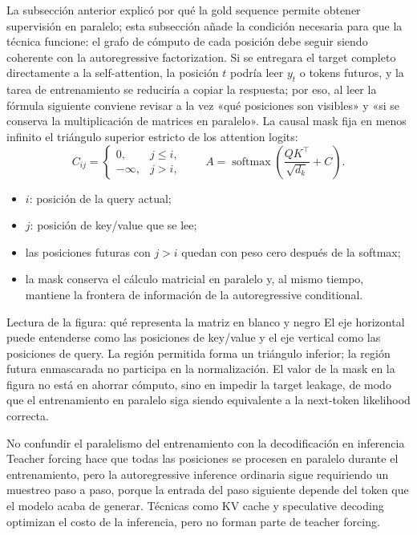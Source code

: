 La subsección anterior explicó por qué la gold sequence permite obtener supervisión en paralelo; esta subsección añade la condición necesaria para que la técnica funcione: el grafo de cómputo de cada posición debe seguir siendo coherente con la autoregressive factorization. Si se entregara el target completo directamente a la self-attention, la posición $t$ podría leer $y_t$ o tokens futuros, y la tarea de entrenamiento se reduciría a copiar la respuesta; por eso, al leer la fórmula siguiente conviene revisar a la vez «qué posiciones son visibles» y «si se conserva la multiplicación de matrices en paralelo». La causal mask fija en menos infinito el triángulo superior estricto de los attention logits:
\[
C_{ij}=\begin{cases}
0, & j\le i,\\
-\infty, & j>i,
\end{cases}
\qquad
A=\operatorname{softmax}\!\left(\frac{QK^{\top}}{\sqrt{d_k}}+C\right).
\]

\begin{itemize}
  \item $i$: posición de la query actual;
  \item $j$: posición de key/value que se lee;
  \item las posiciones futuras con $j>i$ quedan con peso cero después de la softmax;
  \item la mask conserva el cálculo matricial en paralelo y, al mismo tiempo, mantiene la frontera de información de la autoregressive conditional.
\end{itemize}


\begin{knowledgebox}{Lectura de la figura: qué representa la matriz en blanco y negro}
El eje horizontal puede entenderse como las posiciones de key/value y el eje vertical como las posiciones de query. La región permitida forma un triángulo inferior; la región futura enmascarada no participa en la normalización. El valor de la mask en la figura no está en ahorrar cómputo, sino en impedir la target leakage, de modo que el entrenamiento en paralelo siga siendo equivalente a la next-token likelihood correcta.
\end{knowledgebox}

\begin{warningbox}{No confundir el paralelismo del entrenamiento con la decodificación en inferencia}
Teacher forcing hace que todas las posiciones se procesen en paralelo durante el entrenamiento, pero la autoregressive inference ordinaria sigue requiriendo un muestreo paso a paso, porque la entrada del paso siguiente depende del token que el modelo acaba de generar. Técnicas como KV cache y speculative decoding optimizan el costo de la inferencia, pero no forman parte de teacher forcing.
\end{warningbox}

